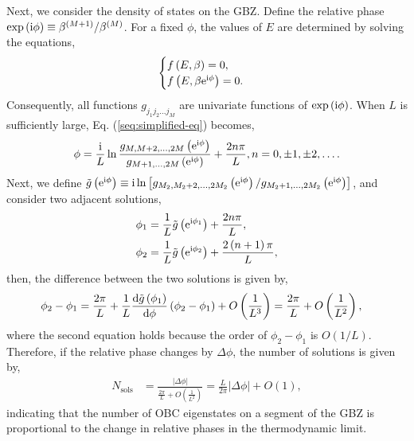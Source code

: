 Next, we consider the density of states on the GBZ. Define the relative
phase $\exp\left(\mathrm{i}\phi\right)\equiv\beta^{(M+1)}/\beta^{(M)}$.
For a fixed $\phi$, the values of $E$ are determined by solving
the equations, 
\begin{equation}
\begin{cases}
f\left(E,\beta\right)=0,\\
f\left(E,\beta\mathrm{e}^{\mathrm{i}\phi}\right)=0.
\end{cases}
\end{equation}
Consequently, all functions $g_{j_{1}j_{2}\dots j_{M}}$ are univariate
functions of $\exp\left(\mathrm{i}\phi\right)$. When $L$ is sufficiently
large, Eq. (\ref{seq:simplified-eq}) becomes, 
\begin{equation}
\phi=\frac{\mathrm{i}}{L}\ln\frac{g_{M,M+2,\dots,2M}\left(\mathrm{e}^{\mathrm{i}\phi}\right)}{g_{M+1,\dots,2M}\left(\mathrm{e}^{\mathrm{i}\phi}\right)}+\frac{2n\pi}{L},n=0,\pm1,\pm2,\dots.\label{seq:phi-eq}
\end{equation}
Next, we define $\tilde{g}\left(\mathrm{e}^{\mathrm{i}\phi}\right)\equiv\mathrm{i}\ln\left[g_{M_{2},M_{2}+2,\dots,2M_{2}}\left(\mathrm{e}^{\mathrm{i}\phi}\right)/g_{M_{2}+1,\dots,2M_{2}}\left(\mathrm{e}^{\mathrm{i}\phi}\right)\right]$,
and consider two adjacent solutions, 
\begin{align}
\phi_{1} & =\frac{1}{L}\tilde{g}\left(\mathrm{e}^{\mathrm{i}\phi_{1}}\right)+\frac{2n\pi}{L},\\
\phi_{2} & =\frac{1}{L}\tilde{g}\left(\mathrm{e}^{\mathrm{i}\phi_{2}}\right)+\frac{2\left(n+1\right)\pi}{L},
\end{align}
then, the difference between the two solutions is given by, 
\begin{align}
\phi_{2}-\phi_{1} & =\frac{2\pi}{L}+\frac{1}{L}\frac{\mathrm{d}\tilde{g}\left(\phi_{1}\right)}{\mathrm{d}\phi}\left(\phi_{2}-\phi_{1}\right)+O\left(\frac{1}{L^{3}}\right)=\frac{2\pi}{L}+O\left(\frac{1}{L^{2}}\right),
\end{align}
where the second equation holds because the order of $\phi_{2}-\phi_{1}$
is $O(1/L)$. Therefore, if the relative phase changes by $\Delta\phi$,
the number of solutions is given by, 
\begin{align}
N_{\text{sols}} & =\frac{\left|\Delta\phi\right|}{\frac{2\pi}{L}+O\left(\frac{1}{L^{2}}\right)}=\frac{L}{2\pi}\left|\Delta\phi\right|+O\left(1\right),\label{eq:sols-and-argument}
\end{align}
indicating that the number of OBC eigenstates on a segment of the
GBZ is proportional to the change in relative phases in the thermodynamic
limit.

